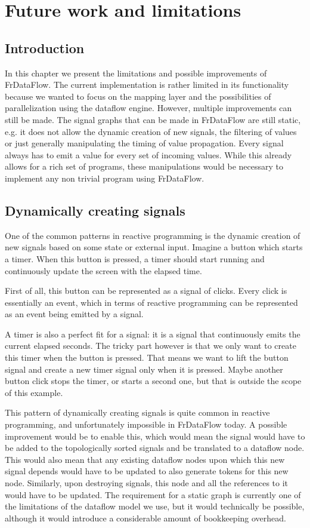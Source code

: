 \chapter{Future work and limitations}

\section{Introduction}

In this chapter we present the limitations and possible improvements of FrDataFlow. 
The current implementation is rather limited in its functionality because we wanted to focus on the mapping layer and the possibilities of parallelization using the dataflow engine.
However, multiple improvements can still be made. The signal graphs that can be made in FrDataFlow are still static, e.g. it does not allow the dynamic creation of new signals, the filtering of values or just generally manipulating the timing of value propagation. Every signal always has to emit a value for every set of incoming values. While this already allows for a rich set of programs, these manipulations would be necessary to implement any non trivial program using FrDataFlow. 

\newpage
\section{Dynamically creating signals}

One of the common patterns in reactive programming is the dynamic creation of new signals based on some state or external input. Imagine a button which starts a timer. When this button is pressed, a timer should start running and continuously update the screen with the elapsed time.

First of all, this button can be represented as a signal of clicks. Every click is essentially an event, which in terms of reactive programming can be represented as an event being emitted by a signal.

A timer is also a perfect fit for a signal: it is a signal that continuously emits the current elapsed seconds. The tricky part however is that we only want to create this timer when the button is pressed. That means we want to lift the button signal and create a new timer signal only when it is pressed. Maybe another button click stops the timer, or starts a second one, but that is outside the scope of this example.

This pattern of dynamically creating signals is quite common in reactive programming, and unfortunately impossible in FrDataFlow today. A possible improvement would be to enable this, which would mean the signal would have to be added to the topologically sorted signals and be translated to a dataflow node. This would also mean that any existing dataflow nodes upon which this new signal depends would have to be updated to also generate tokens for this new node. Similarly, upon destroying signals, this node and all the references to it would have to be updated. The requirement for a static graph is currently one of the limitations of the dataflow model we use, but it would technically be possible, although it would introduce a considerable amount of bookkeeping overhead. 

